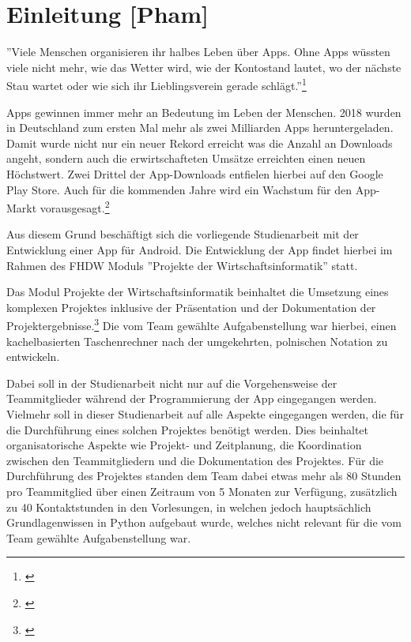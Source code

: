 
\section{Einleitung [Pham]}

''Viele Menschen organisieren ihr halbes Leben über Apps. Ohne Apps wüssten viele nicht mehr, wie das Wetter wird, wie der Kontostand lautet, wo der nächste Stau wartet oder wie sich ihr Lieblingsverein gerade schlägt.''\footnote{\cite[Berg, zitiert nach][]{rondinella2019}}

Apps gewinnen immer mehr an Bedeutung im Leben der Menschen. 2018 wurden in Deutschland zum ersten Mal mehr als zwei Milliarden Apps heruntergeladen. Damit wurde nicht nur ein neuer Rekord erreicht was die Anzahl an Downloads angeht, sondern auch die erwirtschafteten Umsätze erreichten einen neuen Höchstwert. Zwei Drittel der App-Downloads entfielen hierbei auf den Google Play Store. Auch für die kommenden Jahre wird ein Wachstum für den App-Markt vorausgesagt.\footnote{\cite[vgl.][]{rondinella2019}}

Aus diesem Grund beschäftigt sich die vorliegende Studienarbeit mit der Entwicklung einer App für Android. Die Entwicklung der App findet hierbei im Rahmen des FHDW Moduls ''Projekte der Wirtschaftsinformatik'' statt.

Das Modul Projekte der Wirtschaftsinformatik beinhaltet die Umsetzung eines komplexen Projektes inklusive der Präsentation und der Dokumentation der Projektergebnisse.\footnote{\cite[][]{fhdw2020}}  Die vom Team gewählte Aufgabenstellung war hierbei, einen kachelbasierten Taschenrechner nach der umgekehrten, polnischen Notation zu entwickeln. 

Dabei soll in der Studienarbeit nicht nur auf die Vorgehensweise der Teammitglieder während der Programmierung der App eingegangen werden. Vielmehr soll in dieser Studienarbeit auf alle Aspekte eingegangen werden, die für die Durchführung eines solchen Projektes benötigt werden. Dies beinhaltet organisatorische Aspekte wie Projekt- und Zeitplanung, die Koordination zwischen den Teammitgliedern und die Dokumentation des Projektes. Für die Durchführung des Projektes standen dem Team dabei etwas mehr als 80 Stunden pro Teammitglied über einen Zeitraum von 5 Monaten zur Verfügung, zusätzlich zu 40 Kontaktstunden in den Vorlesungen, in welchen jedoch hauptsächlich Grundlagenwissen in Python aufgebaut wurde, welches nicht relevant für die vom Team gewählte Aufgabenstellung war. 